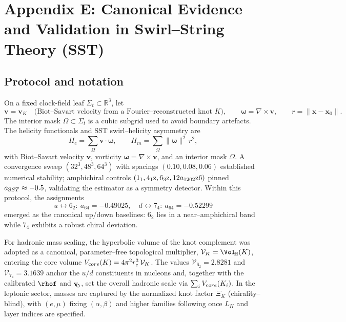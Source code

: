\documentclass[11pt, preprint,titlepage]{revtex4-2}
\newcommand{\swirlarrow}{\!\!\scriptsize\boldsymbol{\circlearrowleft}}
\newcommand{\vswirl}{\mathbf{v}_{\swirlarrow}}
\begin{document}
\section*{Appendix E: Canonical Evidence and Validation in Swirl--String Theory (SST)}
\label{sec:canon-validation}

    \subsection{Protocol and notation}
    On a fixed clock-field leaf \(\Sigma_t\subset\mathbb{R}^3\), let
    \[
    \mathbf v=\mathbf v_K \quad\text{(Biot--Savart velocity from a Fourier–reconstructed knot \(K\))},\qquad
    \boldsymbol\omega=\nabla\times\mathbf v,\qquad
    r=\|\mathbf x-\mathbf x_0\|.
    \]
    The interior mask \(\Omega\subset\Sigma_t\) is a cubic subgrid used to avoid boundary artefacts. The helicity functionals and SST swirl–helicity asymmetry are
    \[
    H_c=\sum_{\Omega}\mathbf v\!\cdot\!\boldsymbol\omega,\qquad
    H_m=\sum_{\Omega}\|\boldsymbol\omega\|^2\,r^2,
    \]
    with Biot–Savart velocity \(\mathbf v\), vorticity \(\boldsymbol{\omega}=\nabla\times\mathbf v\), and an interior mask \(\Omega\). A convergence sweep \((32^3,48^3,64^3)\) with spacings \((0.10,0.08,0.06)\) established numerical stability; amphichiral controls \((1_1,4_1{\textrm z},6_3{\textrm z},12a_{1202}\textrm{z6})\) pinned \(a_{\textrm SST}\approx-0.5\), validating the estimator as a symmetry detector. Within this protocol, the assignments
    \[
        u \leftrightarrow 6_2:\ a_{64}=-0.49025,\quad
        d \leftrightarrow 7_4:\ a_{64}=-0.52299
    \]
    emerged as the canonical up/down baselines: \(6_2\) lies in a near–amphichiral band while \(7_4\) exhibits a robust chiral deviation.

    For hadronic mass scaling, the hyperbolic volume of the knot complement was adopted as a canonical, parameter–free topological multiplier,
    \(\mathcal{V}_K=\Vol_{\!\mathbb{H}}(K)\), entering the core volume \(V_{\textrm core}(K)=4\pi^2 r_c^3\,\mathcal{V}_K\).
    The values \(\mathcal{V}_{6_2}=2.8281\) and \(\mathcal{V}_{7_4}=3.1639\) anchor the \(u/d\) constituents in nucleons and, together with the calibrated \(\rhof\) and \(\vswirl\), set the overall hadronic scale via \(\sum_i V_{\textrm core}(K_i)\).
    In the leptonic sector, masses are captured by the normalized knot factor \(\Xi_K\) (chirality–blind), with \((e,\mu)\) fixing \((\alpha,\beta)\) and higher families following once \(L_K\) and layer indices are specified.
\end{document}
